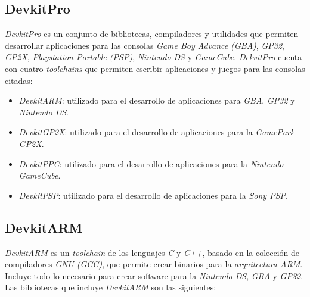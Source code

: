 \subsection{DevkitPro}
\textit{DevkitPro} es un conjunto de bibliotecas, compiladores y utilidades que permiten
desarrollar aplicaciones para las consolas \textit{Game Boy Advance (GBA)}, \textit{GP32}, \textit{GP2X}, \textit{Playstation Portable (PSP)}, \textit{Nintendo DS} y \textit{GameCube}. \textit{DekvitPro} cuenta con cuatro \textit{toolchains} que permiten escribir aplicaciones y juegos para las consolas citadas:

\begin{itemize}
\item \textit{DevkitARM}: utilizado para el desarrollo de aplicaciones para \textit{GBA},
\textit{GP32} y \textit{Nintendo DS}.
%
\item \textit{DevkitGP2X}: utilizado para el desarrollo de aplicaciones para la \textit{GamePark
GP2X}.
%
\item \textit{DevkitPPC}: utilizado para el desarrollo de aplicaciones para la \textit{Nintendo
GameCube}.
\item \textit{DevkitPSP}: utilizado para el desarrollo de aplicaciones para la \textit{Sony
PSP}.
\end{itemize}

\subsection{DevkitARM}
\textit{DevkitARM} es un \textit{toolchain} de los lenguajes \textit{C} y \textit{C++}, basado en la colección de compiladores \textit{GNU (GCC)}, que permite crear binarios para la \textit{arquitectura ARM}. Incluye todo lo necesario para crear software para la \textit{Nintendo DS}, \textit{GBA} y \textit{GP32}. Las bibliotecas que incluye \textit{DevkitARM} son las siguientes:

